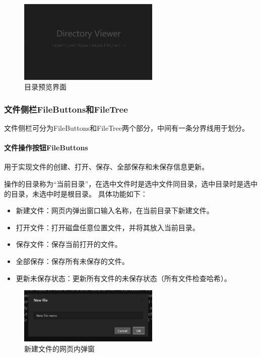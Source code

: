 \documentclass[scheme = chinese]{ctexart}
\begin{document}
\begin{figure}[h]
    \centering
    \includegraphics[width=0.6\textwidth]{images/DivViewer.png}
    \caption{目录预览界面}
\end{figure}


\subsubsection{文件侧栏FileButtons和FileTree}
文件侧栏可分为FileButtons和FileTree两个部分，中间有一条分界线用于划分。

\paragraph{文件操作按钮FileButtons} 用于实现文件的创建、打开、保存、全部保存和未保存信息更新。

操作的目录称为“当前目录”，在选中文件时是选中文件同目录，选中目录时是选中的目录，未选中时是根目录。
具体功能如下：
\begin{itemize}
    \item 新建文件：网页内弹出窗口输入名称，在当前目录下新建文件。
    \item 打开文件：打开磁盘任意位置文件，并将其放入当前目录。
    \item 保存文件：保存当前打开的文件。
    \item 全部保存：保存所有未保存的文件。
    \item 更新未保存状态：更新所有文件的未保存状态（所有文件检查哈希）。
\end{itemize}

\begin{figure}[h]
    \centering
    \includegraphics[width=0.6\textwidth]{images/new-file.png}
    \caption{新建文件的网页内弹窗}
\end{figure}
\end{document}
